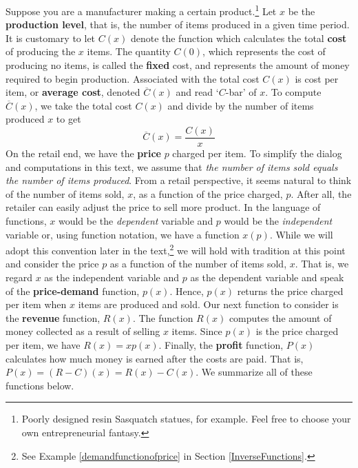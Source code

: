 Suppose you are a manufacturer making a certain product.\footnote{Poorly designed resin Sasquatch statues, for example.  Feel free to choose your own entrepreneurial fantasy.}  Let $x$ be the \textbf{production level}, that is, the number of items produced in a given time period. It is customary to let $C(x)$ denote the function which calculates the total \textbf{cost} of producing the $x$ items.  The quantity $C(0)$, which represents the cost of producing no items, is called the \textbf{fixed} cost, and represents the amount of money required to begin production. Associated with the total cost $C(x)$ is cost per item, or \textbf{average cost}, denoted $\overline{C}(x)$ and read `$C$-bar' of $x$.  To compute $\overline{C}(x)$,  we take the total cost $C(x)$ and divide by the number of items produced $x$ to get \[ \overline{C}(x) = \dfrac{C(x)}{x}\] On the retail end, we have the \textbf{price} $p$ charged per item.  To simplify the dialog and computations in this text, we assume that \textit{the number of items sold equals the number of items produced}. From a retail perspective, it seems natural to think of the number of items sold, $x$, as a function of the price charged, $p$.  After all, the retailer can easily adjust the price to sell more product.  In the language of functions,  $x$ would be the \textit{dependent} variable and $p$ would be the \textit{independent} variable or, using function notation, we have a function $x(p)$.  While we will adopt this convention later in the text,\footnote{See Example \ref{demandfunctionofprice} in Section \ref{InverseFunctions}.} we will hold with tradition at this point and consider the price $p$ as a function of the number of items sold, $x$.  That is, we regard $x$ as the independent variable and $p$ as the dependent variable and speak of the \textbf{price-demand} function, $p(x)$.  Hence, $p(x)$ returns the price charged per item when $x$ items are produced and sold.   Our next function to consider is the \textbf{revenue} function, $R(x)$.  The function $R(x)$ computes the amount of money collected as a result of selling $x$ items.  Since $p(x)$ is the price charged per item, we have $R(x)= x p(x)$.  Finally, the \textbf{profit} function, $P(x)$ calculates how much money is earned after the costs are paid.  That is, $P(x) = (R-C)(x) = R(x) - C(x)$.  We summarize all of these functions below.

\label{pricerevenuecostprofit}

\medskip

